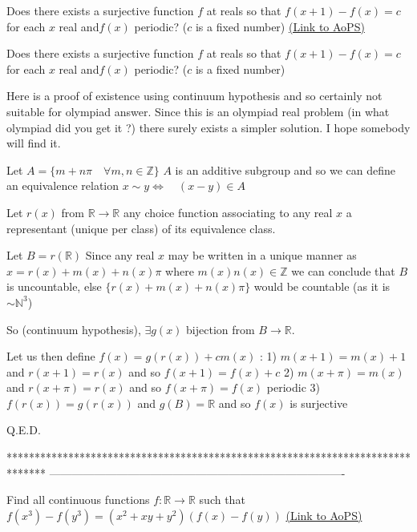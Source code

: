 \begin{problem}
	Does there exists a surjective function $f$ at reals so that $f(x+1)-f(x)=c$ for each $x$ real and$f(x)$ periodic? ($c$ is a fixed number)
	\flushright \href{https://artofproblemsolving.com/community/c6h1617939}{(Link to AoPS)}
\end{problem}



\begin{solution}
	\begin{tcolorbox}Does there exists a surjective function $f$ at reals so that $f(x+1)-f(x)=c$ for each $x$ real and$f(x)$ periodic? ($c$ is a fixed number)\end{tcolorbox}
Here is a proof of existence using continuum hypothesis and so certainly not suitable for olympiad answer.
Since this is an olympiad real problem (in what olympiad did you get it ?) there surely exists a simpler solution.
I hope somebody will find it.

Let $A=\{m+n\pi\quad\forall m,n\in\mathbb Z\}$ 
$A$ is an additive subgroup and so we can define an equivalence relation $x\sim y\iff\quad(x-y)\in A$

Let $r(x)$ from $\mathbb R\to\mathbb R$ any choice function associating to any real $x$ a representant (unique per class) of its equivalence class.

Let $B=r(\mathbb R)$
Since any real $x$ may be written in a unique manner as $x=r(x)+m(x)+n(x)\pi$ where $m(x)n(x)\in\mathbb Z$ we can conclude that $B$ is uncountable, else $\{r(x)+m(x)+n(x)\pi\}$ would be countable (as it is $\sim\mathbb N^3$)

So (continuum hypothesis), $\exists g(x)$ bijection from $B\to\mathbb R$.

Let us then define $f(x)=g(r(x))+cm(x)$ :
1) $m(x+1)=m(x)+1$ and $r(x+1)=r(x)$ and so $f(x+1)=f(x)+c$
2) $m(x+\pi)=m(x)$ and $r(x+\pi)=r(x)$ and so $f(x+\pi)=f(x)$ periodic
3) $f(r(x))=g(r(x))$ and $g(B)=\mathbb R$ and so $f(x)$ is surjective

Q.E.D.
\end{solution}
*******************************************************************************
-------------------------------------------------------------------------------

\begin{problem}
	Find all continuous functions $f: \mathbb{R}\to\mathbb{R}$ such that $f(x^3)-f(y^3)=(x^2+xy+y^2)(f(x)-f(y))$
	\flushright \href{https://artofproblemsolving.com/community/c6h1617962}{(Link to AoPS)}
\end{problem}



